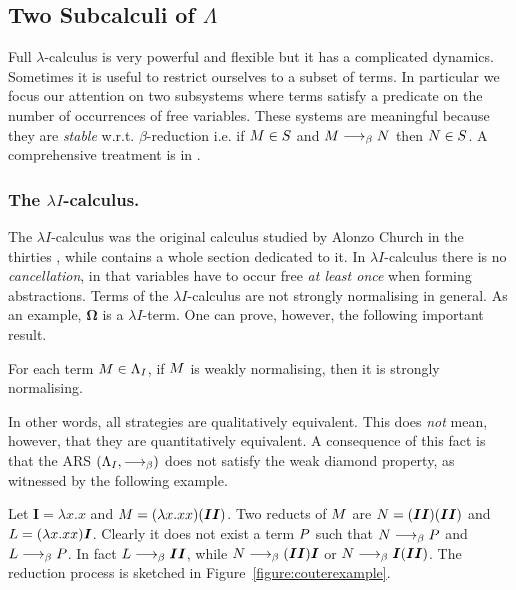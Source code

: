 \subsection{Two Subcalculi of $\Lambda$}
Full $\lambda$-calculus is very powerful and flexible but it has a complicated dynamics. Sometimes it is useful to restrict ourselves to a subset of terms. In particular we focus our attention on two subsystems where terms satisfy a predicate on the number of occurrences of free variables. These systems are meaningful because they are \emph{stable} w.r.t. $\beta$-reduction i.e. if $M\in S$ and $M\longrightarrow_\beta N$ then $N\in S$. A comprehensive treatment is in \cite{sinot_sub-lambda-calculi_2008}.
\subsubsection{The $\lambda I$-calculus.}
The $\lambda I$-calculus was the original calculus studied by Alonzo
Church in the thirties \cite{church_unsolvable_1936}, while
\cite{barendregt_lambda_1984} contains a whole section dedicated to
it. In $\lambda I$-calculus there is no \emph{cancellation}, in that
variables have to occur free \emph{at least once} when forming
abstractions. Terms of the $\lambda I$-calculus are not strongly
normalising in general. As an example, $\bm{\Omega}$ is a $\lambda I$-term.
One can prove, however, the following important result.
\begin{theorem}
	For each term $M\in\Lambda_I$, if $M$ is weakly normalising, then it is strongly normalising.
\end{theorem}
In other words, all strategies are qualitatively equivalent. This does \emph{not} mean, however, that they are quantitatively equivalent. A consequence of this fact is that the ARS $(\Lambda_I,\longrightarrow_\beta)$ does not satisfy the weak diamond property, as witnessed by the following example.
\begin{example}
	Let $\bm{I}=\lambda x.x$ and $M=(\lambda x.xx)(\bm{II})$. Two reducts of $M$ are $N=(\bm{II})(\bm{II})$ and $L=(\lambda x.xx)\bm{I}$. Clearly it does not exist a term $P$ such that $N\longrightarrow_\beta P$ and $L\longrightarrow_\beta P$. In fact $L\longrightarrow_\beta\bm{II}$, while $N\longrightarrow_\beta(\bm{II})\bm{I}$ or $N\longrightarrow_\beta\bm{I}(\bm{II})$. The reduction process is sketched in Figure~\ref{figure:couterexample}.
\end{example}
